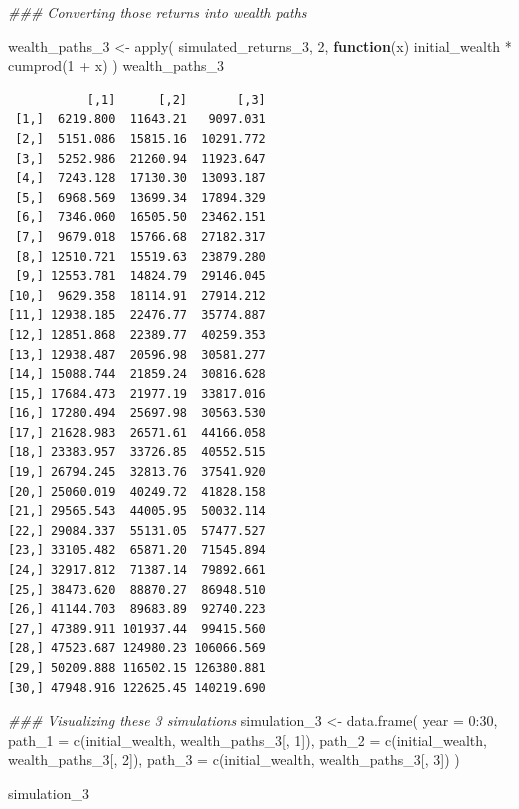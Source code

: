\documentclass[
  letterpaper,
  DIV=11,
  numbers=noendperiod]{scrartcl}
\newenvironment{Shaded}{\begin{snugshade}}{\end{snugshade}}
\newcommand{\AttributeTok}[1]{\textcolor[rgb]{0.40,0.45,0.13}{#1}}
\newcommand{\ControlFlowTok}[1]{\textcolor[rgb]{0.00,0.23,0.31}{\textbf{#1}}}
\newcommand{\DecValTok}[1]{\textcolor[rgb]{0.68,0.00,0.00}{#1}}
\newcommand{\DocumentationTok}[1]{\textcolor[rgb]{0.37,0.37,0.37}{\textit{#1}}}
\newcommand{\FunctionTok}[1]{\textcolor[rgb]{0.28,0.35,0.67}{#1}}
\newcommand{\NormalTok}[1]{\textcolor[rgb]{0.00,0.23,0.31}{#1}}
\newcommand{\OtherTok}[1]{\textcolor[rgb]{0.00,0.23,0.31}{#1}}
\newcommand{\SpecialCharTok}[1]{\textcolor[rgb]{0.37,0.37,0.37}{#1}}
\begin{document}
\begin{Shaded}
\begin{Highlighting}[]
\DocumentationTok{\#\#\# Converting those returns into wealth paths}

\NormalTok{wealth\_paths\_3 }\OtherTok{\textless{}{-}} \FunctionTok{apply}\NormalTok{(}
\NormalTok{    simulated\_returns\_3,}
    \DecValTok{2}\NormalTok{,}
    \ControlFlowTok{function}\NormalTok{(x) initial\_wealth }\SpecialCharTok{*} \FunctionTok{cumprod}\NormalTok{(}\DecValTok{1} \SpecialCharTok{+}\NormalTok{ x)}
\NormalTok{)}
\NormalTok{wealth\_paths\_3}
\end{Highlighting}
\end{Shaded}

\begin{verbatim}
           [,1]      [,2]       [,3]
 [1,]  6219.800  11643.21   9097.031
 [2,]  5151.086  15815.16  10291.772
 [3,]  5252.986  21260.94  11923.647
 [4,]  7243.128  17130.30  13093.187
 [5,]  6968.569  13699.34  17894.329
 [6,]  7346.060  16505.50  23462.151
 [7,]  9679.018  15766.68  27182.317
 [8,] 12510.721  15519.63  23879.280
 [9,] 12553.781  14824.79  29146.045
[10,]  9629.358  18114.91  27914.212
[11,] 12938.185  22476.77  35774.887
[12,] 12851.868  22389.77  40259.353
[13,] 12938.487  20596.98  30581.277
[14,] 15088.744  21859.24  30816.628
[15,] 17684.473  21977.19  33817.016
[16,] 17280.494  25697.98  30563.530
[17,] 21628.983  26571.61  44166.058
[18,] 23383.957  33726.85  40552.515
[19,] 26794.245  32813.76  37541.920
[20,] 25060.019  40249.72  41828.158
[21,] 29565.543  44005.95  50032.114
[22,] 29084.337  55131.05  57477.527
[23,] 33105.482  65871.20  71545.894
[24,] 32917.812  71387.14  79892.661
[25,] 38473.620  88870.27  86948.510
[26,] 41144.703  89683.89  92740.223
[27,] 47389.911 101937.44  99415.560
[28,] 47523.687 124980.23 106066.569
[29,] 50209.888 116502.15 126380.881
[30,] 47948.916 122625.45 140219.690
\end{verbatim}

\begin{Shaded}
\begin{Highlighting}[]
\DocumentationTok{\#\#\# Visualizing these 3 simulations}
\NormalTok{simulation\_3 }\OtherTok{\textless{}{-}} \FunctionTok{data.frame}\NormalTok{(}
    \AttributeTok{year =} \DecValTok{0}\SpecialCharTok{:}\DecValTok{30}\NormalTok{,}
    \AttributeTok{path\_1 =} \FunctionTok{c}\NormalTok{(initial\_wealth, wealth\_paths\_3[, }\DecValTok{1}\NormalTok{]),}
    \AttributeTok{path\_2 =} \FunctionTok{c}\NormalTok{(initial\_wealth, wealth\_paths\_3[, }\DecValTok{2}\NormalTok{]),}
    \AttributeTok{path\_3 =} \FunctionTok{c}\NormalTok{(initial\_wealth, wealth\_paths\_3[, }\DecValTok{3}\NormalTok{])}
\NormalTok{)}

\NormalTok{simulation\_3}
\end{Highlighting}
\end{Shaded}
\end{document}
